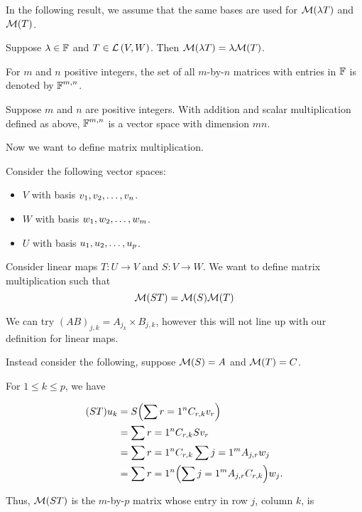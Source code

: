 In the following result, we assume that the same bases are used
for $\mathcal{M}(\lambda T)$ and $\mathcal{M}(T)$.

\begin{theorem} 
   Suppose $\lambda \in \operatorname{\mathbb{F}}$ and $T \in \mathcal{L} \left( V, W \right)$. Then
   $\mathcal{M}(\lambda T) = \lambda \mathcal{M}(T)$.
\end{theorem}

\begin{note} [$\F^{m,n}$]
   For $m$ and $n$ positive integers, the set of all $m$-by-$n$ matrices
   with entries in $\operatorname{\mathbb{F}}$ is denoted by $\F^{m,n}$.
\end{note}

\begin{theorem} [$\dim \F^{m,n} = mn$]
   Suppose $m$ and $n$ are positive integers. With addition and scalar
   multiplication defined as above, $\F^{m, n}$ is a vector space with dimension
   $mn$.
\end{theorem}

Now we want to define matrix multiplication.

Consider the following vector spaces:
\begin{itemize}
   \item $V$ with basis $v_1, v_2, \ldots, v_n$.
   \item $W$ with basis $w_1, w_2, \ldots, w_{m}$.
   \item $U$ with basis $u_1, u_2, \ldots, u_{p}$.
\end{itemize}

Consider linear maps $T: U \to V$ and $S: V \to W$. We
want to define matrix multiplication such that
\[ \mathcal{M}(ST) = \mathcal{M}(S)\mathcal{M}(T) \]

We can try $(AB)_{j,k} = A_{j_k} \times B_{j,k}$, however
this will not line up with our definition for linear maps.

Instead consider the following, suppose $\mathcal{M}(S) = A$ and
$\mathcal{M}(T) = C$.

For $1 \leq k \leq p$, we have

\begin{align*}
   (ST)u_k &= S \qty(\sum{r=1}^n C_{r,k}v_r) \\
   &= \sum{r=1}^n C_{r,k}Sv_r \\
   &= \sum{r=1}^n C_{r,k} \sum{j=1}^m A_{j,r}w_j \\
   &= \sum{r=1}^n \qty(\sum{j=1}^m A_{j,r} C_{r,k}) w_j. 
\end{align*}

Thus, $\mathcal{M}(ST)$ is the $m$-by-$p$ matrix whose entry in row
$j$, column $k$, is

